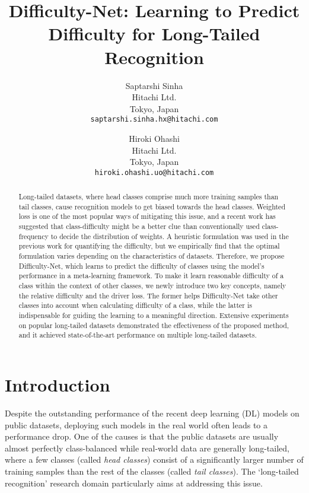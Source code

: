 \documentclass[10pt,twocolumn,letterpaper]{article}
\begin{document}
\title{Difficulty-Net: Learning to Predict Difficulty for Long-Tailed Recognition}

\author{Saptarshi Sinha\\
Hitachi Ltd.\\
Tokyo, Japan\\
{\tt\small saptarshi.sinha.hx@hitachi.com}
\and
Hiroki Ohashi\\
Hitachi Ltd.\\
Tokyo, Japan\\
{\tt\small hiroki.ohashi.uo@hitachi.com}
}

\maketitle
\thispagestyle{empty}

\begin{abstract}
   Long-tailed datasets, where head classes comprise much more training samples than tail classes, cause recognition models to get biased towards the head classes. 
Weighted loss is one of the most popular ways of mitigating this issue, and a recent work has suggested that class-difficulty might be a better clue than conventionally used class-frequency to decide the distribution of weights.
   A heuristic formulation was used in the previous work for quantifying the difficulty, but we empirically find that the optimal formulation varies depending on the characteristics of datasets.
   Therefore, we propose Difficulty-Net, which learns to predict the difficulty of classes using the model's performance in a meta-learning framework.
To make it learn reasonable difficulty of a class within the context of other classes, we newly introduce two key concepts, namely the relative difficulty and the driver loss. 
   The former helps Difficulty-Net take other classes into account when calculating difficulty of a class, while the latter is indispensable for guiding the learning to a meaningful direction.
   Extensive experiments on popular long-tailed datasets demonstrated the effectiveness of the proposed method, and it achieved state-of-the-art performance on multiple long-tailed datasets.
\end{abstract}

\section{Introduction}\label{sec:intro}

Despite the outstanding performance of the recent deep learning (DL) models on public datasets, deploying such models in the real world often leads to a performance drop. 
One of the causes is that the public datasets are usually almost perfectly class-balanced while real-world data are generally long-tailed, where a few classes (called \textit{head classes}) consist of a significantly larger number of training samples than the rest of the classes (called \textit{tail classes}).
The `long-tailed recognition' research domain particularly aims at addressing this issue.
\end{document}
